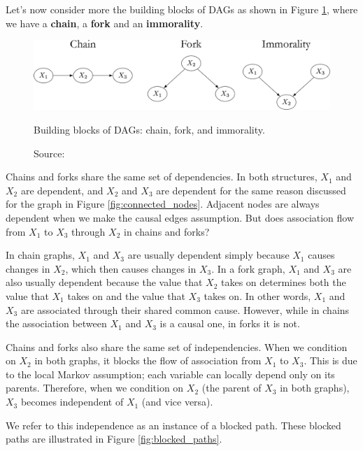 Let's now consider more the building blocks of DAGs
as shown in Figure
\ref{fig:building}, where we have a
\textbf{chain}, a \textbf{fork} and an \textbf{immorality}.

\begin{figure}[h]
    \centering
    \includegraphics[width=\linewidth]{figures/ch3/16.building.png}
    \caption{Building blocks of DAGs: chain, fork, and immorality.}
    \vspace{-10px}
    \caption*{\scriptsize{Source: \cite{Neal_2020a}}}
    \label{fig:building}
\end{figure}

Chains and forks share the same set of dependencies.
In both structures, \(X_1\) and \(X_2\) are dependent,
and \(X_2\) and \(X_3\) are dependent for the same reason discussed
for the graph in Figure \ref{fig:connected_nodes}.
Adjacent nodes are always dependent when we make the causal edges assumption.
But does association flow from \(X_1\) to \(X_3\) through
\(X_2\) in chains and forks?

In chain graphs, \(X_1\) and \(X_3\) are usually dependent simply because
\(X_1\) causes changes in \(X_2\), which then causes changes in \(X_3\).
In a fork graph, \(X_1\) and \(X_3\) are also usually dependent
because the value that \(X_2\) takes on determines both the value that
\(X_1\) takes on and the value that \(X_3\) takes on. In other words,
\(X_1\) and \(X_3\) are associated through their shared common cause.
However, while in chains the association between \(X_1\) and \(X_3\)
is a causal one, in forks it is not.

Chains and forks also share the same set of independencies.
When we condition on \(X_2\) in both graphs,
it blocks the flow of association from \(X_1\) to \(X_3\).
This is due to the local Markov assumption; each variable can locally
depend only on its parents. Therefore, when we condition
on \(X_2\) (the parent of \(X_3\) in both graphs), \(X_3\)
becomes independent of \(X_1\) (and vice versa).

We refer to this independence as an instance of a blocked path.
These blocked paths are illustrated in Figure \ref{fig:blocked_paths}.

